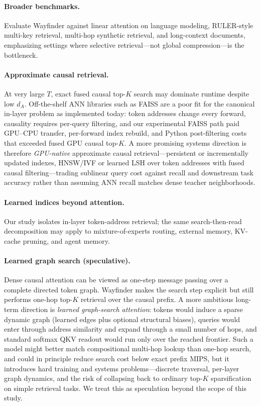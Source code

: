 \documentclass{article}
\begin{document}
\paragraph{Broader benchmarks.}
Evaluate Wayfinder against linear attention on language modeling, RULER-style multi-key retrieval, multi-hop synthetic retrieval, and long-context documents, emphasizing settings where selective retrieval---not global compression---is the bottleneck.

\paragraph{Approximate causal retrieval.}
At very large $T$, exact fused causal top-$K$ search may dominate runtime despite low $d_A$. Off-the-shelf ANN libraries such as FAISS are a poor fit for the canonical in-layer problem as implemented today: token addresses change every forward, causality requires per-query filtering, and our experimental FAISS path paid GPU--CPU transfer, per-forward index rebuild, and Python post-filtering costs that exceeded fused GPU causal top-$K$. A more promising systems direction is therefore \emph{GPU-native} approximate causal retrieval---persistent or incrementally updated indexes, HNSW/IVF or learned LSH over token addresses with fused causal filtering---trading sublinear query cost against recall and downstream task accuracy rather than assuming ANN recall matches dense teacher neighborhoods.

\paragraph{Learned indices beyond attention.}
Our study isolates in-layer token-address retrieval; the same search-then-read decomposition may apply to mixture-of-experts routing, external memory, KV-cache pruning, and agent memory.

\paragraph{Learned graph search (speculative).}
Dense causal attention can be viewed as one-step message passing over a complete directed token graph. Wayfinder makes the search step explicit but still performs one-hop top-$K$ retrieval over the causal prefix. A more ambitious long-term direction is \emph{learned graph-search attention}: tokens would induce a sparse dynamic graph (learned edges plus optional structural biases), queries would enter through address similarity and expand through a small number of hops, and standard softmax QKV readout would run only over the reached frontier. Such a model might better match compositional multi-hop lookup than one-hop search, and could in principle reduce search cost below exact prefix MIPS, but it introduces hard training and systems problems---discrete traversal, per-layer graph dynamics, and the risk of collapsing back to ordinary top-$K$ sparsification on simple retrieval tasks. We treat this as speculation beyond the scope of this study.
\end{document}

